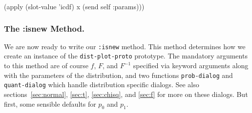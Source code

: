   (apply (slot-value 'icdf) x (send self :params)))
\eatline
{}\nwendcode{}\nwdocspar

\subsubsection{The :isnew Method.}
\label{sec:distisnewmethod}
We are now ready to write our {\tt{}:isnew} method. This method
determines how we create an instance of the {\tt{}dist-plot-proto}
prototype. The mandatory arguments to this method are of course $f$,
$F$, and $F^{-1}$ specified via keyword arguments along with the
parameters of the distribution, and two functions {\tt{}prob-dialog} and
{\tt{}quant-dialog} which handle distribution specific dialogs. See also
sections~\ref{sec:normal}, \ref{sec:t}, \ref{sec:chisq}, and
\ref{sec:f} for more on these dialogs. But first, some sensible
defaults for $p_0$ and $p_1$.

